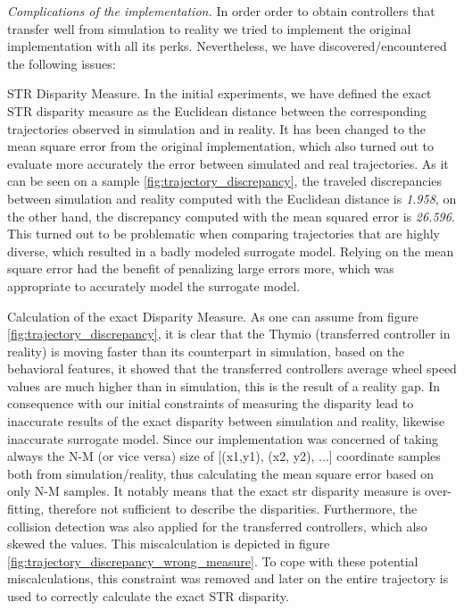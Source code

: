 \emph{Complications of the implementation.} In order order to obtain controllers that transfer well from simulation to reality we tried to implement the original implementation with all its perks. Nevertheless, we have discovered/encountered the following issues:

\begin{description}
	
    \item{STR Disparity Measure}. In the initial experiments, we have defined the exact STR disparity measure as the Euclidean distance between the corresponding trajectories observed in simulation and in reality. It has been changed to the mean square error from the original implementation, which also turned out to evaluate more accurately the error between simulated and real trajectories. As it can be seen on a sample \ref{fig:trajectory_discrepancy}, the traveled discrepancies between simulation and reality computed with the Euclidean distance is \textit{1.958}, on the other hand, the discrepancy computed with the mean squared error is \textit{26.596}. This turned out to be problematic when comparing trajectories that are highly diverse, which resulted in a badly modeled surrogate model. Relying on the mean square error had the benefit of penalizing large errors more, which was appropriate to accurately model the surrogate model. 
    
    \item{Calculation of the exact Disparity Measure}. As one can assume from figure \ref{fig:trajectory_discrepancy}, it is clear that the Thymio (transferred controller in reality) is moving faster than its counterpart in simulation, based on the behavioral features, it showed that the transferred controllers average wheel speed values are much higher than in simulation, this is the result of a reality gap. In consequence with our initial constraints of measuring the disparity lead to inaccurate results of the exact disparity between simulation and reality, likewise inaccurate surrogate model. Since our implementation was concerned of taking always the N-M (or vice versa) size of [(x1,y1), (x2, y2), ...] coordinate samples both from simulation/reality, thus calculating the mean square error based on only N-M samples. It notably means that the exact str disparity measure is over-fitting, therefore not sufficient to describe the disparities. Furthermore, the collision detection was also applied for the transferred controllers, which also skewed the values. This miscalculation is depicted in figure \ref{fig:trajectory_discrepancy_wrong_measure}. To cope with these potential miscalculations, this constraint was removed and later on the entire trajectory is used to correctly calculate the exact STR disparity.
	
\end{description}

